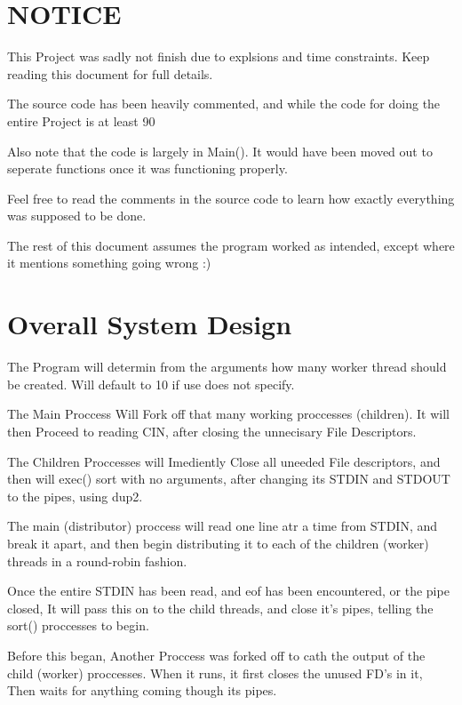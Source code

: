 \documentclass[letterpaper,10pt,titlepage]{article}
\begin{document}
\tableofcontents

\section{NOTICE}

This Project was sadly not finish due to explsions and time constraints.  Keep reading this document for full details.

The source code has been heavily commented, and while the code for doing the entire Project is at least 90%

Also note that the code is largely in Main().  It would have been moved out to seperate functions once it was functioning properly.

Feel free to read the comments in the source code to learn how exactly everything was supposed to be done.

The rest of this document assumes the program worked as intended, except where it mentions something going wrong :)

\section{Overall System Design}

The Program will determin from the arguments how many worker thread should be created.  Will default to 10 if use does not specify.

The Main Proccess Will Fork off that many working proccesses (children).  It will then Proceed to reading CIN, after closing the unnecisary File Descriptors.

The Children Proccesses will Imediently Close all uneeded File descriptors, and then will exec() sort with no arguments, after changing its STDIN and STDOUT to the pipes, using dup2.

The main (distributor) proccess will read one line atr a time from STDIN, and break it apart, and then begin distributing it to each of the children (worker) threads in a round-robin fashion.

Once the entire STDIN has been read, and eof has been encountered, or the pipe closed, It will pass this on to the child threads, and close it's pipes, telling the sort() proccesses to begin.

Before this began, Another Proccess was forked off to cath the output of the child (worker) proccesses.  When it runs, it first closes the unused FD's in it, Then waits for anything coming though its pipes.
\end{document}

